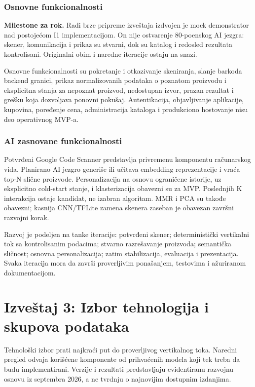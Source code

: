 \documentclass[12pt,a4paper]{article}
\begin{document}
\subsubsection{Osnovne funkcionalnosti}

\textbf{Milestone za rok.} Radi brze pripreme izveštaja izdvojen je mock demonstrator nad postojećom I1 implementacijom. On nije ostvarenje 80-poenskog AI jezgra: skener, komunikacija i prikaz su stvarni, dok su katalog i redosled rezultata kontrolisani. Originalni obim i naredne iteracije ostaju na snazi.

Osnovne funkcionalnosti su pokretanje i otkazivanje skeniranja, slanje barkoda backend granici, prikaz normalizovanih podataka o poznatom proizvodu i eksplicitna stanja za nepoznat proizvod, nedostupan izvor, prazan rezultat i grešku koja dozvoljava ponovni pokušaj. Autentikacija, objavljivanje aplikacije, kupovina, poređenje cena, administracija kataloga i produkciono hostovanje nisu deo operativnog MVP-a.

\subsubsection{AI zasnovane funkcionalnosti}

Potvrđeni Google Code Scanner predstavlja privremenu komponentu računarskog vida. Planirano AI jezgro generiše ili učitava embedding reprezentacije i vraća top-N slične proizvode. Personalizacija na osnovu ograničene istorije, uz eksplicitno cold-start stanje, i klasterizacija obavezni su za MVP. Poslednjih K interakcija ostaje kandidat, ne izabran algoritam. MMR i PCA su takođe obavezni; kasnija CNN/TFLite zamena skenera zaseban je obavezan završni razvojni korak.

Razvoj je podeljen na tanke iteracije: potvrđeni skener; deterministički vertikalni tok sa kontrolisanim podacima; stvarno razrešavanje proizvoda; semantička sličnost; osnovna personalizacija; zatim stabilizacija, evaluacija i prezentacija. Svaka iteracija mora da završi proverljivim ponašanjem, testovima i ažuriranom dokumentacijom.

\section{Izveštaj 3: Izbor tehnologija i skupova podataka}

Tehnološki izbor prati najkraći put do proverljivog vertikalnog toka. Naredni pregled odvaja korišćene komponente od prihvaćenih modela koji tek treba da budu implementirani. Verzije i rezultati predstavljaju evidentiranu razvojnu osnovu iz septembra 2026, a ne tvrdnju o najnovijim dostupnim izdanjima.
\end{document}

